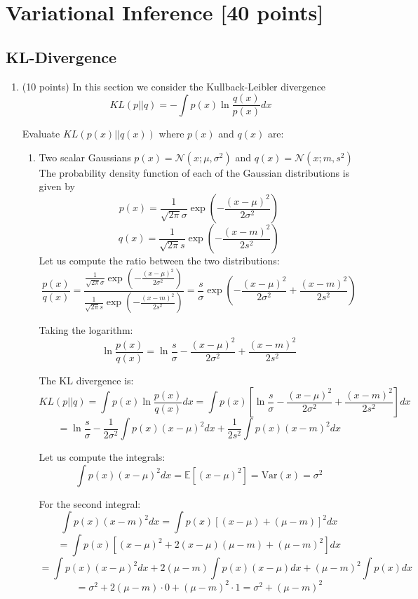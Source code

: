 \documentclass{article}
\begin{document}
\newpage

\section{Variational Inference [40 points]}

\subsection{KL-Divergence}

\begin{enumerate}
\item (10 points) In this section we consider the Kullback-Leibler divergence
$$KL(p||q) = -\int p(x) \ln \frac{q(x)}{p(x)} dx$$

Evaluate $KL(p(x)||q(x))$ where $p(x)$ and $q(x)$ are:
\begin{enumerate}
\item Two scalar Gaussians
$p(x) = \mathcal{N}(x; \mu, \sigma^2)$ and $q(x) = \mathcal{N}(x; m, s^2)$
\\ The probability density function of each of the Gaussian distributions is given by
\[
p(x) = \frac{1}{\sqrt{2\pi}\sigma} \exp\left(-\frac{(x - \mu)^2}{2\sigma^2}\right)
\]
\[
q(x) = \frac{1}{\sqrt{2\pi}s} \exp\left(-\frac{(x - m)^2}{2s^2}\right)
\]
Let us compute the ratio between the two distributions:
\[
\frac{p(x)}{q(x)} = \frac{\frac{1}{\sqrt{2\pi}\sigma} \exp\left(-\frac{(x - \mu)^2}{2\sigma^2}\right)}{\frac{1}{\sqrt{2\pi}s} \exp\left(-\frac{(x - m)^2}{2s^2}\right)} = \frac{s}{\sigma} \exp\left(-\frac{(x - \mu)^2}{2\sigma^2} + \frac{(x - m)^2}{2s^2}\right)
\]

Taking the logarithm:
\[
\ln \frac{p(x)}{q(x)} = \ln\frac{s}{\sigma} - \frac{(x - \mu)^2}{2\sigma^2} + \frac{(x - m)^2}{2s^2}
\]

The KL divergence is:
\[
KL(p||q) = \int p(x) \ln \frac{p(x)}{q(x)} dx = \int p(x) \left[\ln\frac{s}{\sigma} - \frac{(x - \mu)^2}{2\sigma^2} + \frac{(x - m)^2}{2s^2}\right] dx
\]
\[
= \ln\frac{s}{\sigma} - \frac{1}{2\sigma^2}\int p(x)(x - \mu)^2 dx + \frac{1}{2s^2}\int p(x)(x - m)^2 dx
\]

Let us compute the integrals:
\[
\int p(x)(x - \mu)^2 dx = \mathbb{E}[(x - \mu)^2] = \text{Var}(x) = \sigma^2
\]

For the second integral:
\[
\int p(x)(x - m)^2 dx = \int p(x)[(x - \mu) + (\mu - m)]^2 dx
\]
\[
= \int p(x)[(x - \mu)^2 + 2(x - \mu)(\mu - m) + (\mu - m)^2] dx
\]
\[
= \int p(x)(x - \mu)^2 dx + 2(\mu - m)\int p(x)(x - \mu) dx + (\mu - m)^2\int p(x) dx
\]
\[
= \sigma^2 + 2(\mu - m) \cdot 0 + (\mu - m)^2 \cdot 1 = \sigma^2 + (\mu - m)^2
\]


\end{enumerate}
\end{enumerate}
\end{document}
